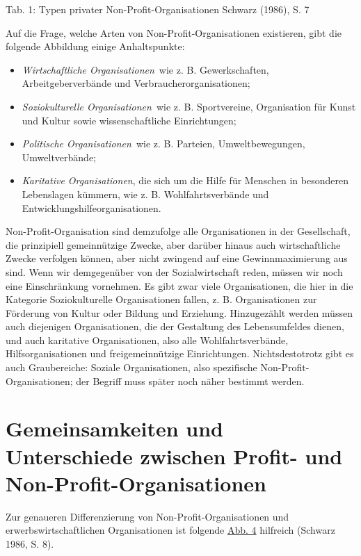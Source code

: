 \documentclass[
  letterpaper,
]{book}
\providecommand{\tightlist}{%
  \setlength{\itemsep}{0pt}\setlength{\parskip}{0pt}}\usepackage{longtable,booktabs,array}
\begin{document}
Tab. 1: Typen privater Non-Profit-Organisationen
\label{table1}{Schwarz (1986), S. 7}

Auf die Frage, welche Arten von Non-Profit-Organisationen existieren,
gibt die folgende Abbildung einige Anhaltspunkte:

\begin{itemize}
\tightlist
\item
  \emph{Wirtschaftliche Organisationen}~wie z. B. Gewerkschaften,
  Arbeitgeberverbände und Verbraucherorganisationen;
\end{itemize}

\begin{itemize}
\item
  \emph{Soziokulturelle Organisationen}~wie z. B. Sportvereine,
  Organisation für Kunst und Kultur sowie wissenschaftliche
  Einrichtungen;
\item
  \emph{Politische Organisationen}~wie z. B. Parteien, Umweltbewegungen,
  Umweltverbände;
\item
  \emph{Karitative Organisationen}, die sich um die Hilfe für Menschen
  in besonderen Lebenslagen kümmern, wie z. B. Wohlfahrtsverbände und
  Entwicklungshilfeorganisationen.
\end{itemize}

Non-Profit-Organisation sind demzufolge alle Organisationen in der
Gesellschaft, die prinzipiell gemeinnützige Zwecke, aber darüber hinaus
auch wirtschaftliche Zwecke verfolgen können, aber nicht zwingend auf
eine Gewinnmaximierung aus sind. Wenn wir demgegenüber von der
Sozialwirtschaft reden, müssen wir noch eine Einschränkung vornehmen. Es
gibt zwar viele Organisationen, die hier in die Kategorie
Soziokulturelle Organisationen fallen, z. B. Organisationen zur
Förderung von Kultur oder Bildung und Erziehung. Hinzugezählt werden
müssen auch diejenigen Organisationen, die der Gestaltung des
Lebensumfeldes dienen, und auch karitative Organisationen, also alle
Wohlfahrtsverbände, Hilfsorganisationen und freigemeinnützige
Einrichtungen. Nichtsdestotrotz gibt es auch Graubereiche: Soziale
Organisationen, also spezifische Non-Profit-Organisationen; der Begriff
muss später noch näher bestimmt werden.

\section{Gemeinsamkeiten und Unterschiede zwischen Profit- und
Non-Profit-Organisationen}\label{vergleichnpo}

Zur genaueren Differenzierung von Non-Profit-Organisationen und
erwerbswirtschaftlichen Organisationen ist folgende
\hyperref[figure4]{Abb. 4} hilfreich (Schwarz 1986, S. 8).
\end{document}
